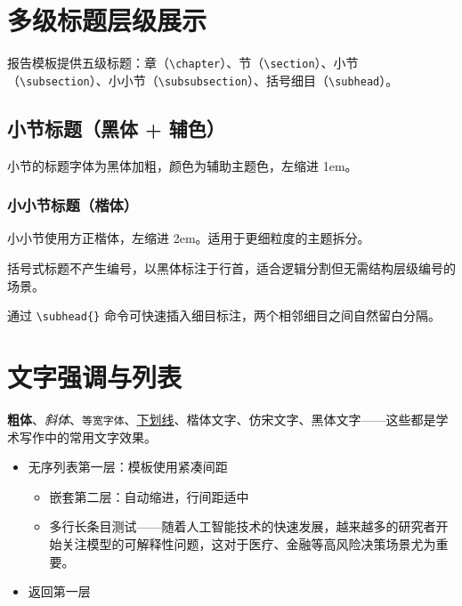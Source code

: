 \documentclass{harryopo-report}
\begin{document}
\section{多级标题层级展示}

报告模板提供五级标题：章（\verb|\chapter|）、节（\verb|\section|）、小节（\verb|\subsection|）、小小节（\verb|\subsubsection|）、括号细目（\verb|\subhead|）。

\subsection{小节标题（黑体 + 辅色）}
小节的标题字体为黑体加粗，颜色为辅助主题色，左缩进 1em。

\subsubsection{小小节标题（楷体）}
小小节使用方正楷体，左缩进 2em。适用于更细粒度的主题拆分。

括号式标题不产生编号，以黑体标注于行首，适合逻辑分割但无需结构层级编号的场景。

通过 \verb|\subhead{}| 命令可快速插入细目标注，两个相邻细目之间自然留白分隔。

\section{文字强调与列表}

\textbf{粗体}、\textit{斜体}、\texttt{等宽字体}、\underline{下划线}、{\fzkt 楷体文字}、{\fzfs 仿宋文字}、{\fzht 黑体文字}——这些都是学术写作中的常用文字效果。

\begin{itemize}
    \item 无序列表第一层：模板使用紧凑间距
    \begin{itemize}
        \item 嵌套第二层：自动缩进，行间距适中
        \item 多行长条目测试——随着人工智能技术的快速发展，越来越多的研究者开始关注模型的可解释性问题，这对于医疗、金融等高风险决策场景尤为重要。
    \end{itemize}
    \item 返回第一层
\end{itemize}
\end{document}
